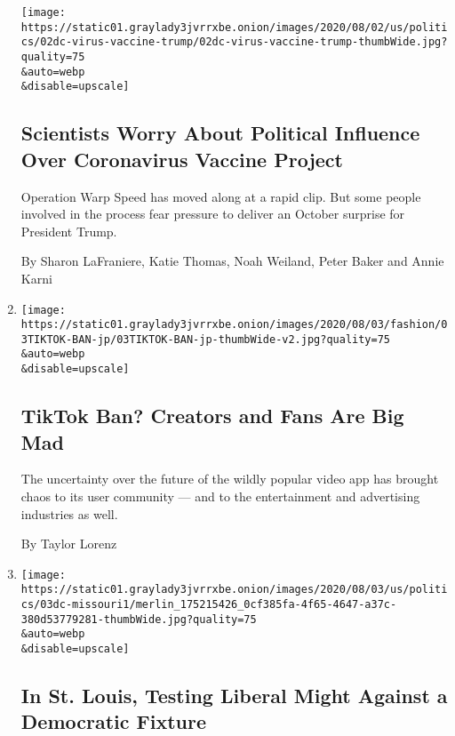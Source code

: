 \begin{enumerate}
  \texttt{[image: https://static01.graylady3jvrrxbe.onion/images/2020/08/02/us/politics/02dc-virus-vaccine-trump/02dc-virus-vaccine-trump-thumbWide.jpg?quality=75\\\&auto=webp\\\&disable=upscale]}

  \hypertarget{scientists-worry-about-political-influence-over-coronavirus-vaccine-project-1}{%
  \subsection{Scientists Worry About Political Influence Over
  Coronavirus Vaccine
  Project}\label{scientists-worry-about-political-influence-over-coronavirus-vaccine-project-1}}

  Operation Warp Speed has moved along at a rapid clip. But some people
  involved in the process fear pressure to deliver an October surprise
  for President Trump.

  By Sharon LaFraniere, Katie Thomas, Noah Weiland, Peter Baker and
  Annie Karni
\item
  \href{/2020/08/02/style/tiktok-ban-threat-trump.html}{}

  \texttt{[image: https://static01.graylady3jvrrxbe.onion/images/2020/08/03/fashion/03TIKTOK-BAN-jp/03TIKTOK-BAN-jp-thumbWide-v2.jpg?quality=75\\\&auto=webp\\\&disable=upscale]}

  \hypertarget{tiktok-ban-creators-and-fans-are-big-mad}{%
  \subsection{TikTok Ban? Creators and Fans Are Big
  Mad}\label{tiktok-ban-creators-and-fans-are-big-mad}}

  The uncertainty over the future of the wildly popular video app has
  brought chaos to its user community --- and to the entertainment and
  advertising industries as well.

  By Taylor Lorenz
\item
  \href{/2020/08/02/us/politics/cori-bush-william-lacy-clay-missouri.html}{}

  \texttt{[image: https://static01.graylady3jvrrxbe.onion/images/2020/08/03/us/politics/03dc-missouri1/merlin\_175215426\_0cf385fa-4f65-4647-a37c-380d53779281-thumbWide.jpg?quality=75\\\&auto=webp\\\&disable=upscale]}

  \hypertarget{in-st-louis-testing-liberal-might-against-a-democratic-fixture}{%
  \subsection{In St. Louis, Testing Liberal Might Against a Democratic
  Fixture}\label{in-st-louis-testing-liberal-might-against-a-democratic-fixture}}


\end{enumerate}
